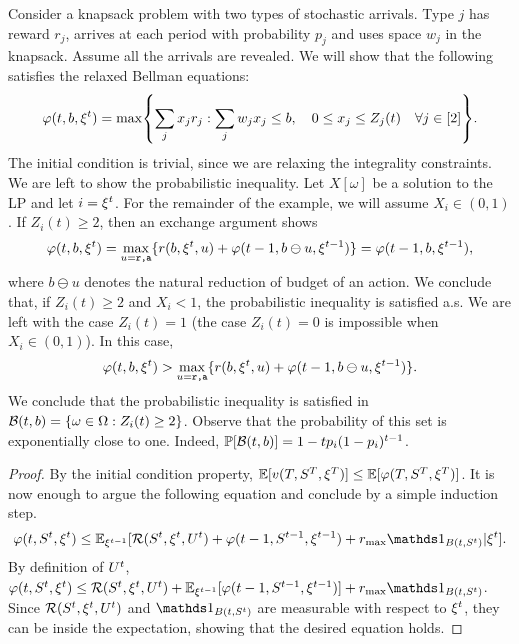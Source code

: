 \documentclass[letterpaper,11pt]{article}
\begin{document}
\begin{example}
Consider a knapsack problem with two types of stochastic arrivals.
Type $j$ has reward $r_j$, arrives at each period with probability $p_j$ and uses space $w_j$ in the knapsack.
Assume all the arrivals are revealed.
We will show that the following satisfies the relaxed Bellman equations:
\[
\varphi(t,b,\xit) = \max\crl*{\sum_{j}x_jr_j:\sum_{j}w_jx_j\leq b, \quad 0\leq x_j \leq Z_j(t) \quad \forall j\in[2]}.
\]
The initial condition is trivial, since we are relaxing the integrality constraints.
We are left to show the probabilistic inequality.
Let $X[\omega]$ be a solution to the LP and let $i=\xi^t$.
For the remainder of the example, we will assume $X_i\in(0,1)$.
If $Z_i(t)\geq 2$,  then an exchange argument shows
\[
\varphi(t,b,\xi^t) = \max_{u=\texttt{r,a}}\{r(b,\xi^t,u)+\varphi(t-1,b\ominus u,\xi^{t-1})\}
= \varphi(t-1,b,\xi^{t-1}),
\]
where $b\ominus u$ denotes the natural reduction of budget of an action.
We conclude that, if $Z_i(t)\geq 2$ and $X_i<1$, the probabilistic inequality is satisfied a.s.
We are left with the case $Z_i(t)=1$ (the case $Z_i(t)=0$ is impossible when $X_i\in (0,1)$).
In this case, 
\[
\varphi(t,b,\xi^t) > \max_{u=\texttt{r,a}}\{r(b,\xi^t,u)+\varphi(t-1,b\ominus u,\xi^{t-1})\}.
\]
We conclude that the probabilistic inequality is satisfied in $\mathcal{B}(t,b)=\{\omega\in\Omega:Z_i(t)\geq 2\}$.
Observe that the probability of this set is exponentially close to one.
Indeed, $\mathbb{P}[\mathcal{B}(t,b)]=1-tp_i(1-p_i)^{t-1}$.
\end{example}

\begin{proof}
By the initial condition property, $\mathbb{E}[v(T,S^T,\xi^T)] \leq \mathbb{E}[\varphi(T,S^T,\xi^T)]$.
It is now enough to argue the following equation and conclude by a simple induction step.
\[
\varphi(t,\St,\xit)\leq \E_{\xi^{t-1}}[\Re(\St,\xit,\Ut)+\varphi(t-1,S^{t-1},\xi^{t-1}) +  \rmax\Ins{B(t,\St)}|\xit].
\]
By definition of $U^t$, $\varphi(t,\St,\xit)\leq \Re(\St,\xit,\Ut)+\E_{\xi^{t-1}}[\varphi(t-1,S^{t-1},\xi^{t-1})] +  \rmax\Ins{B(t,\St)}$.
Since $\mathcal{R}(S^t,\xi^t,U^t)$ and $\Ins{B(t,\St)}$ are measurable with respect to $\xi^t$, they can be inside the expectation, showing that the desired equation holds.
\end{proof}
\end{document}
